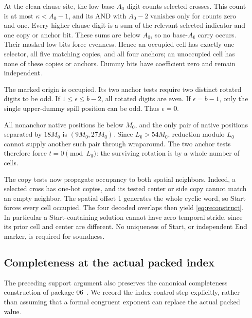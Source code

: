 At the clean clause site, the low base-\(A_0\) digit counts
selected crosses. This count is at most \(\kappa<A_0-1\), and
its AND with \(A_0-2\) vanishes only for counts zero and one.
Every higher clause digit is a sum of the relevant selected
indicator and one copy or anchor bit. These sums are below \(A_0\),
so no base-\(A_0\) carry occurs. Their masked low bits force
evenness. Hence an occupied cell has exactly one selector, all
five matching copies, and all four anchors; an unoccupied cell
has none of these copies or anchors. Dummy bits have coefficient
zero and remain independent.

The marked origin is occupied. Its two anchor tests require
two distinct rotated digits to be odd. If
\(1\le\epsilon\le b-2\), all rotated digits are even.
If \(\epsilon=b-1\), only the single upper-dummy spill position
can be odd. Thus \(\epsilon=0\).

All nonanchor native positions lie below \(M_0\), and the only
pair of native positions separated by \(18M_0\) is
\((9M_0,27M_0)\). Since \(L_0>54M_0\), reduction modulo \(L_0\)
cannot supply another such pair through wraparound.
The two anchor tests therefore force \(t=0\pmod{L_0}\):
the surviving rotation is by a whole number of cells.

The copy tests now propagate occupancy to both spatial neighbors.
Indeed, a selected cross has one-hot copies, and its tested
center or side copy cannot match an empty neighbor. The spatial
offset \(1\) generates the whole cyclic word, so Start forces
every cell occupied. The four decoded overlaps then yield
\eqref{eq:reconstruct}. In particular a Start-containing solution
cannot have zero temporal stride, since its prior cell and center
are different. No uniqueness of Start, or independent End marker,
is required for soundness.

\subsection{Completeness at the actual packed index}

The preceding support argument also preserves the canonical
completeness construction of package 06~\cite{blank06}. We record
the index-control step explicitly, rather than assuming that a
formal congruent exponent can replace the actual packed value.

